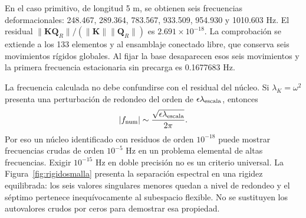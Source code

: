 \documentclass[oneside,a4paper,spanish,links,pagenumbers]{amca}
\begin{document}
En el caso primitivo, de longitud 5 m, se obtienen seis frecuencias deformacionales: 248.467, 289.364, 783.567, 933.509, 954.930 y 1010.603 Hz. El residual $\|\bm K\bm Q_R\|/(\|\bm K\|\|\bm Q_R\|)$ es $2.691\times10^{-18}$. La comprobación se extiende a los 133 elementos y al ensamblaje conectado libre, que conserva seis movimientos rígidos globales. Al fijar la base desaparecen esos seis movimientos y la primera frecuencia estacionaria sin precarga es 0.1677683 Hz.

La frecuencia calculada no debe confundirse con el residual del núcleo. Si $\lambda_K=\omega^2$ presenta una perturbación de redondeo del orden de $\epsilon\lambda_{\rm escala}$, entonces
\begin{equation}
 |f_{\rm num}|\sim\frac{\sqrt{\epsilon\lambda_{\rm escala}}}{2\pi}.
\end{equation}
Por eso un núcleo identificado con residuos de orden $10^{-18}$ puede mostrar frecuencias crudas de orden $10^{-5}$ Hz en un problema elemental de altas frecuencias. Exigir $10^{-15}$ Hz en doble precisión no es un criterio universal. La Figura~\ref{fig:rigidosmalla} presenta la separación espectral en una rigidez equilibrada: los seis valores singulares menores quedan a nivel de redondeo y el séptimo pertenece inequívocamente al subespacio flexible. No se sustituyen los autovalores crudos por ceros para demostrar esa propiedad.
\end{document}
